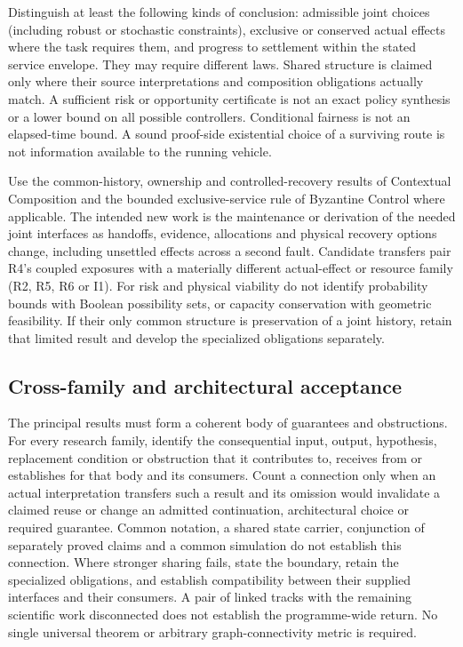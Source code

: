 \documentclass[11pt]{article}
\begin{document}
Distinguish at least the following kinds of conclusion: admissible joint choices (including robust or stochastic constraints), exclusive or conserved actual effects where the task requires them, and progress to settlement within the stated service envelope. They may require different laws. Shared structure is claimed only where their source interpretations and composition obligations actually match. A sufficient risk or opportunity certificate is not an exact policy synthesis or a lower bound on all possible controllers. Conditional fairness is not an elapsed-time bound. A sound proof-side existential choice of a surviving route is not information available to the running vehicle.

Use the common-history, ownership and controlled-recovery results of Contextual Composition and the bounded exclusive-service rule of Byzantine Control where applicable. The intended new work is the maintenance or derivation of the needed joint interfaces as handoffs, evidence, allocations and physical recovery options change, including unsettled effects across a second fault. Candidate transfers pair R4's coupled exposures with a materially different actual-effect or resource family (R2, R5, R6 or I1). For risk and physical viability do not identify probability bounds with Boolean possibility sets, or capacity conservation with geometric feasibility. If their only common structure is preservation of a joint history, retain that limited result and develop the specialized obligations separately.

\subsection*{Cross-family and architectural acceptance}
The principal results must form a coherent body of guarantees and obstructions. For every research family, identify the consequential input, output, hypothesis, replacement condition or obstruction that it contributes to, receives from or establishes for that body and its consumers. Count a connection only when an actual interpretation transfers such a result and its omission would invalidate a claimed reuse or change an admitted continuation, architectural choice or required guarantee. Common notation, a shared state carrier, conjunction of separately proved claims and a common simulation do not establish this connection. Where stronger sharing fails, state the boundary, retain the specialized obligations, and establish compatibility between their supplied interfaces and their consumers. A pair of linked tracks with the remaining scientific work disconnected does not establish the programme-wide return. No single universal theorem or arbitrary graph-connectivity metric is required.
\end{document}
